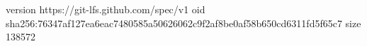 version https://git-lfs.github.com/spec/v1
oid sha256:76347af127ea6eac7480585a50626062c9f2af8be0af58b650cd6311fd5f65c7
size 138572
